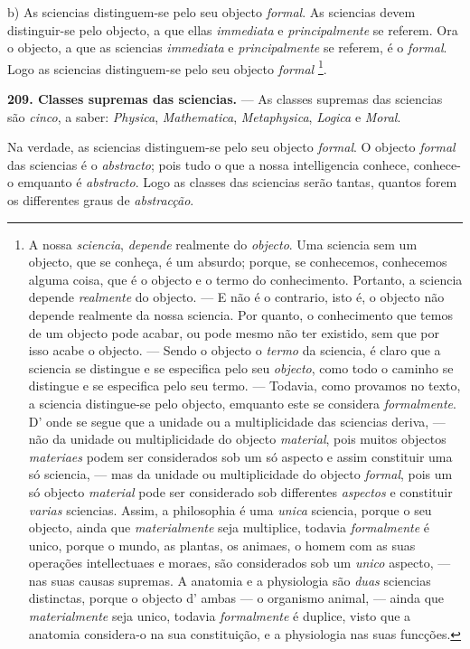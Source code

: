 b) As sciencias distinguem-se pelo seu objecto \emph{formal}. As sciencias devem distinguir-se pelo objecto, a que ellas \emph{immediata} e \emph{principalmente} se referem. Ora o objecto, a que as sciencias \emph{immediata} e \emph{principalmente} se referem, é o \emph{formal}. Logo as sciencias distinguem-se pelo seu objecto \emph{formal} \footnote{A nossa \emph{sciencia}, \emph{depende} realmente do \emph{objecto}. Uma sciencia sem um objecto, que se conheça, é um absurdo; porque, se conhecemos, conhecemos alguma coisa, que é o objecto e o termo do conhecimento. Portanto, a sciencia depende \emph{realmente} do objecto. --- E não é o contrario, isto é, o objecto não depende realmente da nossa sciencia. Por quanto, o conhecimento que temos de um objecto pode acabar, ou pode mesmo não ter existido, sem que por isso acabe o objecto. --- Sendo o objecto o \emph{termo} da sciencia, é claro que a sciencia se distingue e se especifica pelo seu \emph{objecto}, como todo o caminho se distingue e se especifica pelo seu termo. --- Todavia, como provamos no texto, a sciencia distingue-se pelo objecto, emquanto este se considera \emph{formalmente}. D' onde se segue que a unidade ou a multiplicidade das sciencias deriva, --- não da unidade ou multiplicidade do objecto \emph{material}, pois muitos objectos \emph{materiaes} podem ser considerados sob um só aspecto e assim constituir uma só sciencia, --- mas da unidade ou multiplicidade do objecto \emph{formal}, pois um só objecto \emph{material} pode ser considerado sob differentes \emph{aspectos} e constituir \emph{varias} sciencias. Assim, a philosophia é uma \emph{unica} sciencia, porque o seu objecto, ainda que \emph{materialmente} seja multiplice, todavia \emph{formalmente} é unico, porque o mundo, as plantas, os animaes, o homem com as suas operações intellectuaes e moraes, são considerados sob um \emph{unico} aspecto, --- nas suas causas supremas. A anatomia e a physiologia são \emph{duas} sciencias distinctas, porque o objecto d' ambas --- o organismo animal, --- ainda que \emph{materialmente} seja unico, todavia \emph{formalmente} é duplice, visto que a anatomia considera-o na sua constituição, e a physiologia nas suas funcções.}.

\textbf{209. Classes supremas das sciencias.} --- As classes supremas das sciencias são \emph{cinco}, a saber: \emph{Physica}, \emph{Mathematica}, \emph{Metaphysica}, \emph{Logica} e \emph{Moral}.

Na verdade, as sciencias distinguem-se pelo seu objecto \emph{formal}. O objecto \emph{formal} das sciencias é o \emph{abstracto}; pois tudo o que a nossa intelligencia conhece, conhece-o emquanto é \emph{abstracto}. Logo as classes das sciencias serão tantas, quantos forem os differentes graus de \emph{abstracção}.

